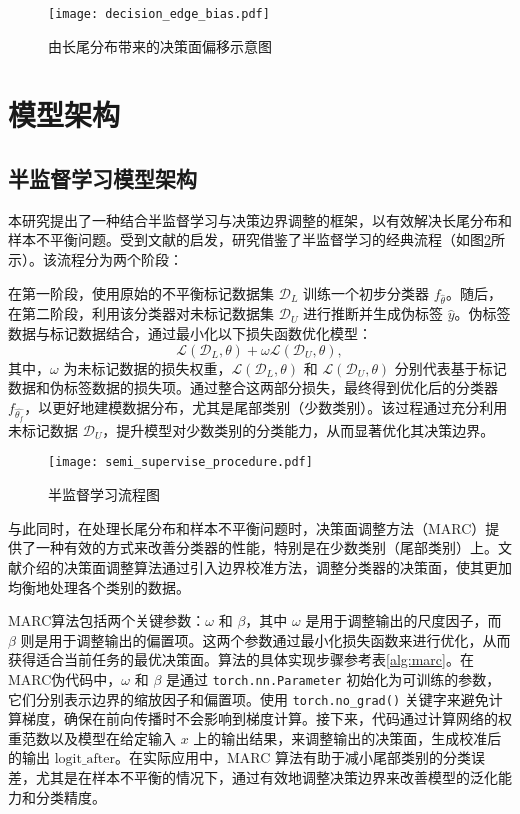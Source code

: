 \documentclass[master]{thesis-uestc}
\begin{document}
\begin{figure}[h]
    \centering
    \texttt{[image: decision\_edge\_bias.pdf]}
    \caption{由长尾分布带来的决策面偏移示意图}
    \label{decision_edge_bias}
\end{figure}

\section{模型架构}
\subsection{半监督学习模型架构}
本研究提出了一种结合半监督学习与决策边界调整的框架，以有效解决长尾分布和样本不平衡问题。受到文献\cite{yang2020rethinking,wang2023margin}的启发，研究借鉴了半监督学习的经典流程（如图\ref{semi_supervise_procedure}所示）。该流程分为两个阶段：

在第一阶段，使用原始的不平衡标记数据集 $\mathcal{D}_{L}$ 训练一个初步分类器 $f_{\hat{\theta}}$。随后，在第二阶段，利用该分类器对未标记数据集 $\mathcal{D}_{U}$ 进行推断并生成伪标签 $\hat{y}$。伪标签数据与标记数据结合，通过最小化以下损失函数优化模型：
\begin{equation} 
    \mathcal{L}(\mathcal{D}_{L},\theta) + \omega \mathcal{L}(\mathcal{D}_{U},\theta), 
\end{equation}
其中，$\omega$ 为未标记数据的损失权重，$\mathcal{L}(\mathcal{D}_{L},\theta)$ 和 $\mathcal{L}(\mathcal{D}_{U},\theta)$ 分别代表基于标记数据和伪标签数据的损失项。通过整合这两部分损失，最终得到优化后的分类器 $f_{\hat{\theta_f}}$，以更好地建模数据分布，尤其是尾部类别（少数类别）。该过程通过充分利用未标记数据 $\mathcal{D}_{U}$，提升模型对少数类别的分类能力，从而显著优化其决策边界。

\begin{figure}[h]
    \centering
    \texttt{[image: semi\_supervise\_procedure.pdf]}
    \caption{半监督学习流程图}
    \label{semi_supervise_procedure}
\end{figure}

与此同时，在处理长尾分布和样本不平衡问题时，决策面调整方法（MARC）提供了一种有效的方式来改善分类器的性能，特别是在少数类别（尾部类别）上。文献\cite{wang2023margin}介绍的决策面调整算法通过引入边界校准方法，调整分类器的决策面，使其更加均衡地处理各个类别的数据。

MARC算法包括两个关键参数：$\omega$ 和 $\beta$，其中 $\omega$ 是用于调整输出的尺度因子，而 $\beta$ 则是用于调整输出的偏置项。这两个参数通过最小化损失函数来进行优化，从而获得适合当前任务的最优决策面。算法的具体实现步骤参考表\ref{alg:marc}。在MARC伪代码中，$\omega$ 和 $\beta$ 是通过 \verb|torch.nn.Parameter| 初始化为可训练的参数，它们分别表示边界的缩放因子和偏置项。使用 \verb|torch.no_grad()| 关键字来避免计算梯度，确保在前向传播时不会影响到梯度计算。接下来，代码通过计算网络的权重范数以及模型在给定输入 $x$ 上的输出结果，来调整输出的决策面，生成校准后的输出 $\text{logit\_after}$。在实际应用中，MARC 算法有助于减小尾部类别的分类误差，尤其是在样本不平衡的情况下，通过有效地调整决策边界来改善模型的泛化能力和分类精度。
\end{document}
